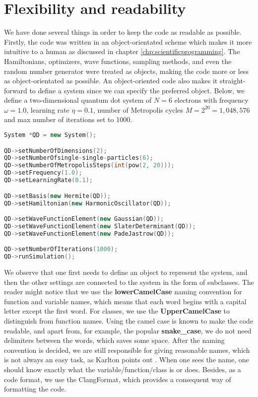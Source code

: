 \section{Flexibility and readability}
We have done several things in order to keep the code as readable as possible. Firstly, the code was written in an object-orientated scheme which makes it more intuitive to a human as discussed in chapter \ref{chp:scientificprogramming}. The Hamiltonians, optimizers, wave functions, sampling methods, and even the random number generator were treated as objects, making the code more or less as object-orientated as possible. An object-oriented code also makes it straight-forward to define a system since we can specify the preferred object. Below, we define a two-dimensional quantum dot system of $N=6$ electrons with frequency $\omega=1.0$, learning rate $\eta=0.1$, number of Metropolis cycles $M=2^{20}=1,048,576$ and max number of iterations set to 1000.

\begin{lstlisting}[language={C++}, caption={Example on how a quantum dot system can be initialized.}, label={lst:qd}]
System *QD = new System();

QD->setNumberOfDimensions(2);
QD->setNumberOfsingle-single-particles(6);
QD->setNumberOfMetropolisSteps(int(pow(2, 20)));
QD->setFrequency(1.0);
QD->setLearningRate(0.1);

QD->setBasis(new Hermite(QD));
QD->setHamiltonian(new HarmonicOscillator(QD));

QD->setWaveFunctionElement(new Gaussian(QD));
QD->setWaveFunctionElement(new SlaterDeterminant(QD));
QD->setWaveFunctionElement(new PadeJastrow(QD));

QD->setNumberOfIterations(1000);
QD->runSimulation();
\end{lstlisting}
We observe that one first needs to define an object to represent the system, and then the other settings are connected to the system in the form of subclasses. The reader might notice that we use the \textbf{lowerCamelCase} naming convention for function and variable names, which means that each word begins with a capital letter except the first word. For classes, we use the \textbf{UpperCamelCase} to distinguish from function names. Using the camel case is known to make the code readable, and apart from, for example, the popular \textbf{snake\_case}, we do not need delimiters between the words, which saves some space. After the naming convention is decided, we are still responsible for giving reasonable names, which is not always an easy task, as Karlton points out \supercite{fowler_bliki:_nodate}. When one sees the name, one should know exactly what the variable/function/class is or does. Besides, as a code format, we use the ClangFormat, which provides a consequent way of formatting the code. 

